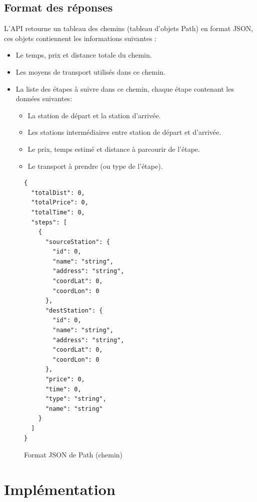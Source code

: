 \subsection{Format des réponses}
\label{ref:formatReponse}
L'API retourne un tableau des chemins (tableau d'objets Path) en format JSON, ces objets contiennent les informations suivantes :
\begin{itemize}
	\item Le temps, prix et distance totale du chemin.
	\item Les moyens de transport utilisés dans ce chemin.
	\item La liste des étapes à suivre dans ce chemin, chaque étape contenant les données suivantes:
	      \begin{itemize}
	      	\item La station de départ et la station d'arrivée.
	      	\item Les stations intermédiaires entre station de départ et d'arrivée.
	      	\item Le prix, temps estimé et distance à parcourir de l'étape.
	      	\item Le transport à prendre (ou type de l'étape).
	      \end{itemize}
\end{itemize}

\begin{figure}
\begin{lstlisting}[]
{
  "totalDist": 0,
  "totalPrice": 0,
  "totalTime": 0,
  "steps": [
    {
      "sourceStation": {
        "id": 0,
        "name": "string",
        "address": "string",
        "coordLat": 0,
        "coordLon": 0
      },
      "destStation": {
        "id": 0,
        "name": "string",
        "address": "string",
        "coordLat": 0,
        "coordLon": 0
      },
      "price": 0,
      "time": 0,
      "type": "string",
      "name": "string"
    }
  ]
}
\end{lstlisting}
\caption{Format JSON de Path (chemin)}
\end{figure}

\section{Implémentation}
\label{ref:Implementation}
